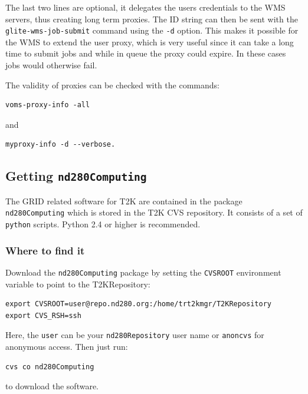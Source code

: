\documentclass[11pt]{article}
\begin{document}
The last two lines are optional, it delegates the users credentials to the
WMS servers, thus creating long term proxies. The ID string can then be
sent with the \verb+glite-wms-job-submit+ command using the \verb+-d+ option.
This makes it possible for the WMS to extend the user proxy, which is
very useful since it can take a long time to submit jobs and while in
queue the proxy could expire. In these cases jobs would otherwise fail.

The validity of proxies can be checked with the commands:
\begin{verbatim}
voms-proxy-info -all
\end{verbatim}
and
\begin{verbatim}
myproxy-info -d --verbose.
\end{verbatim}

\subsection{Getting \texttt{nd280Computing}}
The GRID related software for T2K are contained in the package
\verb+nd280Computing+ which is stored in the T2K CVS
repository. It consists of a set of \verb+python+ scripts. Python 2.4
or higher is recommended.

\subsubsection*{Where to find it}
Download the \verb+nd280Computing+ package by setting the
\verb+CVSROOT+ environment variable to point to the T2KRepository:

\begin{verbatim}
export CVSROOT=user@repo.nd280.org:/home/trt2kmgr/T2KRepository
export CVS_RSH=ssh
\end{verbatim}

Here, the \verb+user+ can be your \verb+nd280Repository+ user name or
\verb+anoncvs+ for anonymous access. Then just run: 
\begin{verbatim}
cvs co nd280Computing
\end{verbatim}
to download the software.
 
\end{document}
